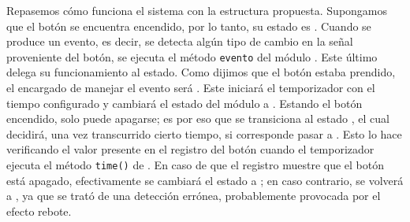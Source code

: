 \begin{figure}[H]
\begin{center}
{
}
\end{center}
\end{figure}


Repasemos cómo funciona el sistema con la estructura propuesta. Supongamos que el botón se encuentra encendido, por lo tanto, su estado es \On. Cuando se produce un evento, es decir, se detecta algún tipo de cambio en la señal proveniente del botón, se ejecuta el método \verb|evento| del módulo \Boton. Este último delega su funcionamiento al estado. Como dijimos que el botón estaba prendido, el encargado de manejar el evento será \On. Este iniciará el temporizador con el tiempo configurado y cambiará el estado del módulo \Boton a \WaitOff. Estando el botón encendido, solo puede apagarse; es por eso que se transiciona al estado \WaitOff, el cual decidirá, una vez transcurrido cierto tiempo, si corresponde pasar a \Off. Esto lo hace verificando el valor presente en el registro del botón cuando el temporizador ejecuta el método \verb|time()| de \Boton. En caso de que el registro muestre que el botón está apagado, efectivamente se cambiará el estado a \Off; en caso contrario, se volverá a \On, ya que se trató de una detección errónea, probablemente provocada por el efecto rebote. 

